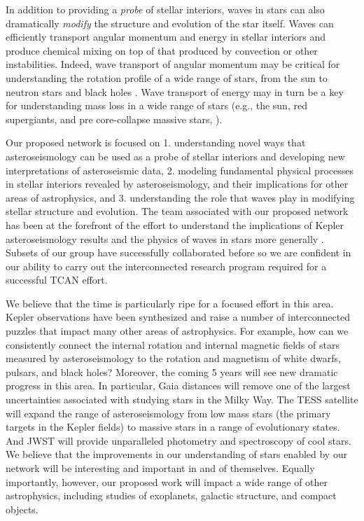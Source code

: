 In addition to providing a {\em probe} of stellar interiors, waves in stars can also dramatically {\em modify} the structure and evolution of the star itself.  Waves can efficiently transport angular momentum and energy in stellar interiors and produce chemical mixing on top of that produced by convection or other instabilities.   Indeed, wave transport of angular momentum may be critical for understanding the rotation profile of a wide range of stars, from the sun to neutron stars and black holes \citep{Kumar_1999,fullerwave:14,fullerwave:15}.  Wave transport of energy may in turn be a key for understanding mass loss in a wide range of stars (e.g., the sun, red supergiants, and pre core-collapse massive stars, \citealt{quataert:12,fuller:17}).   

Our proposed network is focused on 1. understanding novel ways that asteroseismology can be used as a probe of stellar interiors and developing new interpretations of asteroseismic data, 2. modeling fundamental physical processes in stellar interiors revealed by asteroseismology, and their implications for other areas of astrophysics, and 3. understanding the role that waves play in modifying stellar structure and evolution.  The team associated with our proposed network has been at the forefront of the effort to understand the implications of Kepler asteroseismology results and the physics of waves in stars more generally \citep{bildsten:12,shiode:13,lecoanet:13}. Subsets of our group have successfully collaborated before so we are confident in our ability to carry out the interconnected research program required for a successful TCAN effort.   

We believe that the time is particularly ripe for a focused effort in this area.  Kepler observations have been synthesized and raise a number of interconnected puzzles that impact many other areas of astrophysics.  For example, how can we consistently connect the internal rotation and internal magnetic fields of stars measured by asteroseismology to the rotation and magnetism of white dwarfs, pulsars, and black holes?  Moreover, the coming 5 years will see new dramatic progress in this area. In particular, Gaia distances will remove one of the largest uncertainties associated with studying stars in the Milky Way.  The TESS satellite will expand the range of asteroseismology from low mass stars (the primary targets in the Kepler fields) to massive stars in a range of evolutionary states.   And JWST will provide unparalleled photometry and spectroscopy of cool stars. We believe that the improvements in our understanding of stars enabled by our network will be interesting and important in and of themselves.  Equally importantly, however, our proposed work will impact a wide range of other astrophysics, including studies of exoplanets, galactic structure, and compact objects.   


